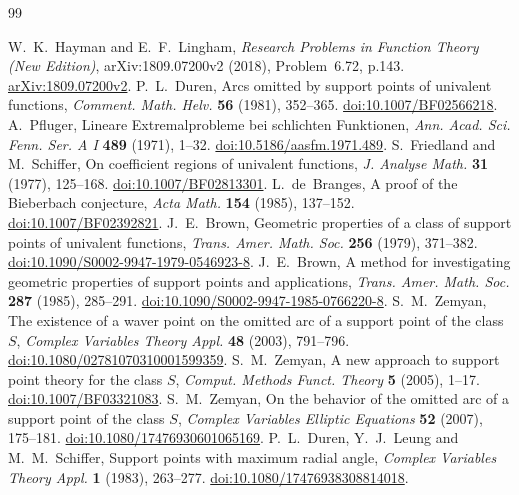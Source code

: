 \documentclass[10pt]{article}
\begin{document}
\begin{thebibliography}{99}
\raggedright
{}
W.~K.~Hayman and E.~F.~Lingham, \emph{Research Problems in Function
Theory (New Edition)}, arXiv:1809.07200v2 (2018), Problem~6.72, p.143.
\href{https://arxiv.org/abs/1809.07200v2}{arXiv:1809.07200v2}.
P.~L.~Duren, Arcs omitted by support points of univalent functions,
\emph{Comment. Math. Helv.} \textbf{56} (1981), 352--365.
\href{https://doi.org/10.1007/BF02566218}{doi:10.1007/BF02566218}.
A.~Pfluger, Lineare Extremalprobleme bei schlichten Funktionen,
\emph{Ann. Acad. Sci. Fenn. Ser. A I} \textbf{489} (1971), 1--32.
\href{https://doi.org/10.5186/aasfm.1971.489}{doi:10.5186/aasfm.1971.489}.
S.~Friedland and M.~Schiffer, On coefficient regions of univalent
functions, \emph{J. Analyse Math.} \textbf{31} (1977), 125--168.
\href{https://doi.org/10.1007/BF02813301}{doi:10.1007/BF02813301}.
L.~de~Branges, A proof of the Bieberbach conjecture,
\emph{Acta Math.} \textbf{154} (1985), 137--152.
\href{https://doi.org/10.1007/BF02392821}{doi:10.1007/BF02392821}.
J.~E.~Brown, Geometric properties of a class of support points of
univalent functions, \emph{Trans. Amer. Math. Soc.} \textbf{256}
(1979), 371--382.
\href{https://doi.org/10.1090/S0002-9947-1979-0546923-8}{doi:10.1090/S0002-9947-1979-0546923-8}.
J.~E.~Brown, A method for investigating geometric properties of
support points and applications,
\emph{Trans. Amer. Math. Soc.} \textbf{287} (1985), 285--291.
\href{https://doi.org/10.1090/S0002-9947-1985-0766220-8}{doi:10.1090/S0002-9947-1985-0766220-8}.
S.~M.~Zemyan, The existence of a waver point on the omitted arc of
a support point of the class \(S\),
\emph{Complex Variables Theory Appl.} \textbf{48} (2003), 791--796.
\href{https://doi.org/10.1080/02781070310001599359}{doi:10.1080/02781070310001599359}.
S.~M.~Zemyan, A new approach to support point theory for the class
\(S\), \emph{Comput. Methods Funct. Theory} \textbf{5} (2005), 1--17.
\href{https://doi.org/10.1007/BF03321083}{doi:10.1007/BF03321083}.
S.~M.~Zemyan, On the behavior of the omitted arc of a support point
of the class \(S\),
\emph{Complex Variables Elliptic Equations} \textbf{52} (2007), 175--181.
\href{https://doi.org/10.1080/17476930601065169}{doi:10.1080/17476930601065169}.
P.~L.~Duren, Y.~J.~Leung and M.~M.~Schiffer,
Support points with maximum radial angle,
\emph{Complex Variables Theory Appl.} \textbf{1} (1983), 263--277.
\href{https://doi.org/10.1080/17476938308814018}{doi:10.1080/17476938308814018}.

\end{thebibliography}
\end{document}
